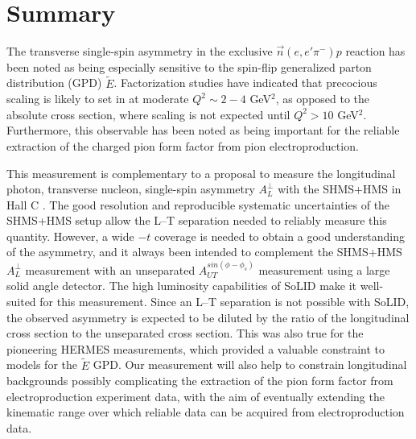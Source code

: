 \documentclass{article}
\begin{document}
\newpage


\newpage


\newpage


\newpage
\section{Summary}

The transverse single-spin asymmetry in the exclusive $\vec{n}(e,e'\pi^-)p$
reaction has been noted as being
especially sensitive to the spin-flip generalized parton distribution (GPD)
$\tilde{E}$.  Factorization studies have indicated that precocious scaling
is likely to set in at moderate $Q^2\sim 2-4$ GeV$^2$, as opposed to the
absolute cross section, where scaling is not expected until $Q^2>10$ GeV$^2$.
Furthermore, this observable has been noted as being important for the reliable
extraction of the charged pion form factor from pion electroproduction.

This measurement is complementary to a proposal 
to measure the longitudinal photon, transverse nucleon, single-spin
asymmetry $A_L^{\perp}$ with the SHMS+HMS in Hall C \cite{atpi39}.  
The good resolution and reproducible systematic uncertainties of the
SHMS+HMS setup allow the L--T separation needed to reliably measure this
quantity.
However, a wide $-t$ coverage is needed to obtain a good understanding of the
asymmetry, and it always been intended to complement the SHMS+HMS $A_L^{\perp}$
measurement with an unseparated $A_{UT}^{sin(\phi-\phi_s)}$ measurement using
a large solid angle detector.  The high luminosity capabilities of SoLID make
it well-suited for this measurement.  Since an L--T separation is not possible
with SoLID, the observed asymmetry is expected to be diluted by the ratio of
the longitudinal cross section to the unseparated cross section.  This was also
true for the pioneering HERMES measurements, which provided a valuable
constraint to models for the $\tilde{E}$ GPD.
Our measurement will also help to constrain longitudinal backgrounds
possibly complicating the extraction of the pion form factor from
electroproduction experiment data, with the aim of eventually extending the
kinematic range over which reliable data can be acquired from electroproduction
data.


\newpage
\appendix


\newpage

\end{document}
